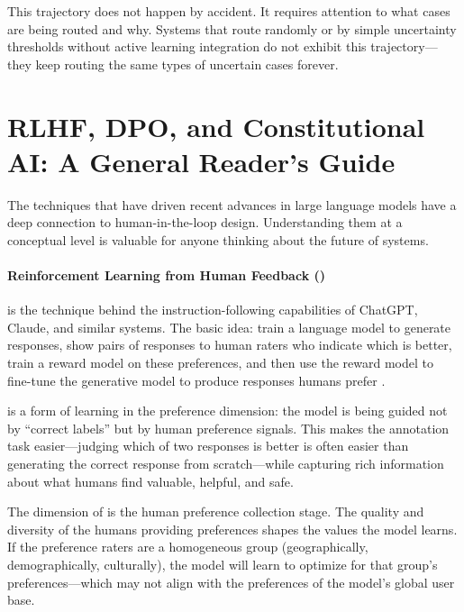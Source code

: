 This trajectory does not happen by accident. It requires attention to what cases are being routed and why. Systems that route randomly or by simple uncertainty thresholds without active learning integration do not exhibit this trajectory---they keep routing the same types of uncertain cases forever.

\section{RLHF, DPO, and Constitutional AI: A General Reader's Guide}
\label{sec:ch17-rlhf-dpo-cai}

The techniques that have driven recent advances in large language models have a deep connection to human-in-the-loop design. Understanding them at a conceptual level is valuable for anyone thinking about the future of \hitl systems.

\paragraph{Reinforcement Learning from Human Feedback (\rlhf)} is the technique behind the instruction-following capabilities of ChatGPT, Claude, and similar systems. The basic idea: train a language model to generate responses, show pairs of responses to human raters who indicate which is better, train a reward model on these preferences, and then use the reward model to fine-tune the generative model to produce responses humans prefer \autocite{christiano2017deep,ouyang2022training}.

\rlhf is a form of \hitl learning in the preference dimension: the model is being guided not by ``correct labels'' but by human preference signals. This makes the annotation task easier---judging which of two responses is better is often easier than generating the correct response from scratch---while capturing rich information about what humans find valuable, helpful, and safe.

The \hitl dimension of \rlhf is the human preference collection stage. The quality and diversity of the humans providing preferences shapes the values the model learns. If the preference raters are a homogeneous group (geographically, demographically, culturally), the model will learn to optimize for that group's preferences---which may not align with the preferences of the model's global user base.


